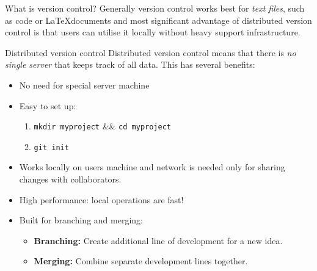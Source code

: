 \documentclass[final,hyperref={pdfpagelabels=false},notitlepage=true]{beamer}
\begin{document}
\begin{frame}{}
\begin{columns}[t]
\begin{column}{0.45\linewidth}
\begin{block}{\large What is version control?}
\vpace{1cm}
      Generally version control works best for \emph{text files}, such
      as code or \LaTeX documents and
most significant advantage of distributed version control is that 
users can utilise it locally without heavy support infrastructure.

    \end{block}

\vpace{1cm}
    \begin{block}{\large Distributed version control}
      Distributed version control means that there is \emph{no single server}
      that keeps track of all data. This has several benefits:
      \begin{itemize}
        \item No need for special server machine
        \item Easy to set up:
          \begin{enumerate}
            \item {\tt mkdir myproject} \&\& {\tt cd myproject}
            \item {\tt git init}
          \end{enumerate}
        \item Works locally on users machine and network is needed
          only for sharing changes with collaborators.
        \item High performance: local operations are fast!
        \item Built for branching and merging:
          \begin{itemize}
            \item {\bf Branching:} Create additional line of
              development for a new idea.
            \item {\bf Merging:} Combine separate development lines
              together.
          \end{itemize}
      \end{itemize}
    \end{block}


\end{column}
\end{columns}
\end{frame}
\end{document}
